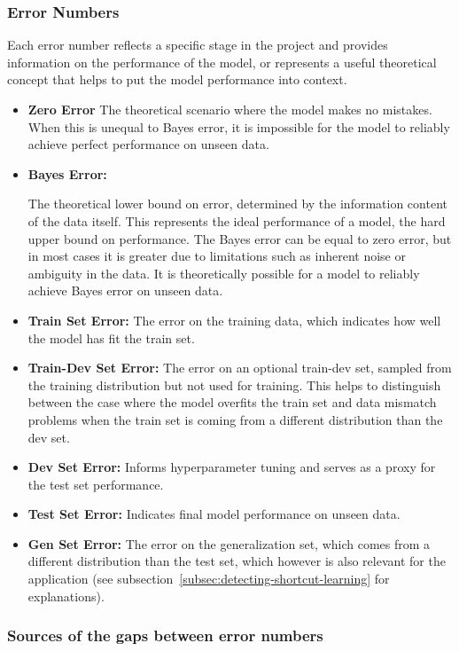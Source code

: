 \documentclass[12pt,openany]{book}
\begin{document}
\subsubsection{Error Numbers}
Each error number reflects a specific stage in the project and provides information on the performance of the model, or represents a useful theoretical concept that helps to put the model performance into context.
\begin{itemize}
    \item \textbf{Zero Error} The theoretical scenario where the model makes no mistakes. When this is unequal to Bayes error, it is impossible for the model to reliably achieve perfect performance on unseen data.
    \item \hypertarget{bayes-error}{\textbf{Bayes Error:}} The theoretical lower bound on error, determined by the information content of the data itself. This represents the ideal performance of a model, the hard upper bound on performance. The Bayes error can be equal to zero error, but in most cases it is greater due to limitations such as inherent noise or ambiguity in the data. It is theoretically possible for a model to reliably achieve Bayes error on unseen data.
    \item \textbf{Train Set Error:} The error on the training data, which indicates how well the model has fit the train set.
    \item \textbf{Train-Dev Set Error:} The error on an optional train-dev set, sampled from the training distribution but not used for training. This helps to distinguish between the case where the model overfits the train set and data mismatch problems when the train set is coming from a different distribution than the dev set.
    \item \textbf{Dev Set Error:} Informs hyperparameter tuning and serves as a proxy for the test set performance.
    \item \textbf{Test Set Error:} Indicates final model performance on unseen data.
    \item \textbf{Gen Set Error:} The error on the generalization set, which comes from a different distribution than the test set, which however is also relevant for the application (see subsection~\ref{subsec:detecting-shortcut-learning} for explanations).
\end{itemize}

\subsubsection{Sources of the gaps between error numbers}
\end{document}
